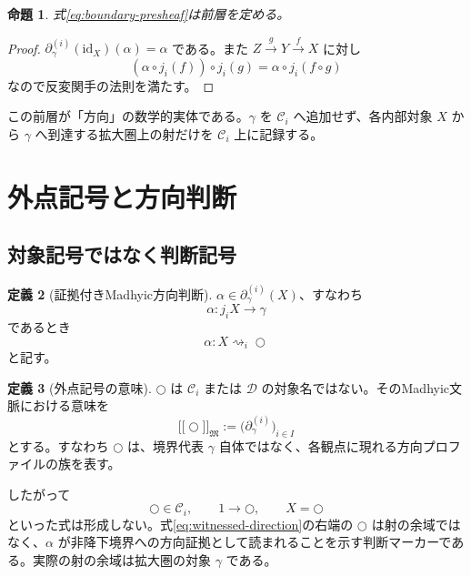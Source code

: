 \documentclass[a4paper,11pt]{ltjsarticle}
\theoremstyle{definition}
\newtheorem{definition}{定義}[section]
\theoremstyle{plain}
\newtheorem{proposition}[definition]{命題}
\newcommand{\dfix}{\bigcirc}
\newcommand{\sem}[1]{\mathopen{[\![}#1\mathclose{]\!]}}
\begin{document}
\begin{proposition}
式\eqref{eq:boundary-presheaf}は前層を定める。
\end{proposition}

\begin{proof}
$\partial_\gamma^{(i)}(\mathrm{id}_X)(\alpha)=\alpha$ である。また $Z\xrightarrow{g}Y\xrightarrow{f}X$ に対し
\[
 (\alpha\circ j_i(f))\circ j_i(g)
 =\alpha\circ j_i(f\circ g)
\]
なので反変関手の法則を満たす。
\end{proof}

この前層が「方向」の数学的実体である。$\gamma$ を $\mathcal C_i$ へ追加せず、各内部対象 $X$ から $\gamma$ へ到達する拡大圏上の射だけを $\mathcal C_i$ 上に記録する。

\section{外点記号と方向判断}

\subsection{対象記号ではなく判断記号}

\begin{definition}[証拠付きMadhyic方向判断]
$\alpha\in\partial_\gamma^{(i)}(X)$、すなわち
\[
 \alpha:j_iX\longrightarrow\gamma
\]
であるとき
\begin{equation}
 \alpha:X\rightsquigarrow_i\dfix
 \label{eq:witnessed-direction}
\end{equation}
と記す。
\end{definition}

\begin{definition}[外点記号の意味]
$\dfix$ は $\mathcal C_i$ または $\mathcal D$ の対象名ではない。そのMadhyic文脈における意味を
\begin{equation}
 \sem{\dfix}_{\mathfrak M}
 :=\bigl(\partial_\gamma^{(i)}\bigr)_{i\in I}
 \label{eq:external-marker-semantics}
\end{equation}
とする。すなわち $\dfix$ は、境界代表 $\gamma$ 自体ではなく、各観点に現れる方向プロファイルの族を表す。
\end{definition}

したがって
\[
 \dfix\in\mathcal C_i,
 \qquad
 1\to\dfix,
 \qquad
 X=\dfix
\]
といった式は形成しない。式\eqref{eq:witnessed-direction}の右端の $\dfix$ は射の余域ではなく、$\alpha$ が非降下境界への方向証拠として読まれることを示す判断マーカーである。実際の射の余域は拡大圏の対象 $\gamma$ である。
\end{document}
